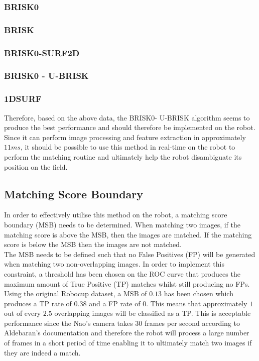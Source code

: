 \documentclass{article}
\begin{document}
\subsubsection{BRISK0}
\label{sec:briskResults}

\subsubsection{BRISK}
\label{sec:brisk2dsurfResults}

\subsubsection{BRISK0-SURF2D}
\label{sec:brisk2dsurfResults}


\subsubsection{BRISK0 - U-BRISK}
\label{sec:BRISK0Results}


\subsubsection{1DSURF}
\label{sec:1dsurfResults}

Therefore, based on the above data, the BRISK0- U-BRISK algorithm seems to produce the best performance and should therefore be implemented on the robot. Since it can perform image processing and feature extraction in approximately $11 ms$, it should be possible to use this method in real-time on the robot to perform the matching routine and ultimately help the robot disambiguate its position on the field.\\

\subsection{Matching Score Boundary}
\label{sec:matchingScoreBoundary}
In order to effectively utilise this method on the robot, a matching score boundary (MSB) needs to be determined. When matching two images, if the matching score is above the MSB, then the images are matched. If the matching score is below the MSB then the images are not matched. \\

The MSB needs to be defined such that no False Positives (FP) will be generated when matching two non-overlapping images. In order to implement this constraint, a threshold has been chosen on the ROC curve that produces the maximum amount of True Positive (TP) matches whilst still producing no FPs. Using the original Robocup dataset, a MSB of $0.13$ has been chosen which produces a TP rate of $0.38$ and a FP rate of $0$. This means that approximately $1$ out of every $2.5$ overlapping images will be classified as a TP. This is acceptable performance since the Nao's camera takes $30$ frames per second according to Aldebaran's documentation and therefore the robot will process a large number of frames in a short period of time enabling it to ultimately match two images if they are indeed a match.\\
\end{document}
